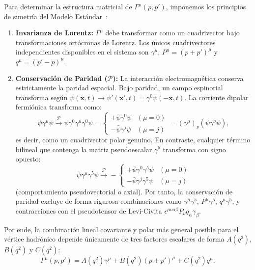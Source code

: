 \documentclass[10pt,a4paper]{article}
\begin{document}
Para determinar la estructura matricial de $\Gamma^\mu(p, p')$, imponemos los principios de simetría del Modelo Estándar~\cite{henley2007,griffiths2008}:
\begin{enumerate}
    \item \textbf{Invarianza de Lorentz:} $\Gamma^\mu$ debe transformar como un cuadrivector bajo transformaciones ortócronas de Lorentz. Los únicos cuadrivectores independientes disponibles en el sistema son $\gamma^\mu$, $P^\mu = (p+p')^\mu$ y $q^\mu = (p'-p)^\mu$.
    \item \textbf{Conservación de Paridad ($\mathcal{P}$):} La interacción electromagnética conserva estrictamente la paridad espacial. Bajo paridad, un campo espinorial transforma según $\psi(\mathbf{x}, t) \to \psi'(\mathbf{x}', t) = \gamma^0 \psi(-\mathbf{x}, t)$. La corriente dipolar fermiónica transforma como:
    \begin{equation}
    \bar{\psi} \gamma^\mu \psi \xrightarrow{\mathcal{P}} \bar{\psi} \gamma^0 \gamma^\mu \gamma^0 \psi = \begin{cases} +\bar{\psi}\gamma^0\psi & (\mu=0) \\ -\bar{\psi}\gamma^j\psi & (\mu=j) \end{cases} = (\gamma^\mu)_\nu (\bar{\psi}\gamma^\nu\psi),
    \end{equation}
    es decir, como un cuadrivector polar genuino. En contraste, cualquier término bilineal que contenga la matriz pseudoescalar $\gamma^5$ transforma con signo opuesto:
    \begin{equation}
    \bar{\psi} \gamma^\mu \gamma^5 \psi \xrightarrow{\mathcal{P}} -\begin{cases} +\bar{\psi}\gamma^0\gamma^5\psi & (\mu=0) \\ -\bar{\psi}\gamma^j\gamma^5\psi & (\mu=j) \end{cases}
    \end{equation}
    (comportamiento pseudovectorial o axial). Por tanto, la conservación de paridad excluye de forma rigurosa combinaciones como $\gamma^\mu\gamma^5$, $P^\mu\gamma^5$, $q^\mu\gamma^5$, y contracciones con el pseudotensor de Levi-Civita $\epsilon^{\mu\nu\alpha\beta}P_\nu q_\alpha \gamma_\beta$.
\end{enumerate}
Por ende, la combinación lineal covariante y polar más general posible para el vértice hadrónico depende únicamente de tres factores escalares de forma $A(q^2)$, $B(q^2)$ y $C(q^2)$:
\begin{equation}
\Gamma^\mu(p, p') = A(q^2) \gamma^\mu + B(q^2) (p + p')^\mu + C(q^2) q^\mu.
\label{eq:vertice_general_abc}
\end{equation}
\end{document}
